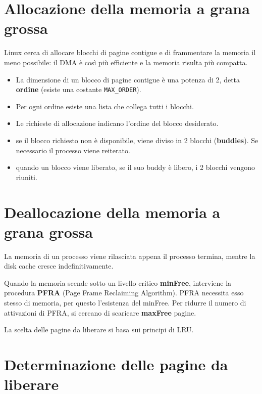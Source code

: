 \documentclass[12pt, a4paper]{report}
\begin{document}
\section{Allocazione della memoria a grana grossa}
Linux cerca di allocare blocchi di pagine contigue e di frammentare la memoria il
meno possibile: il DMA è così più efficiente e la memoria risulta più compatta.

\begin{itemize}
	\item La dimensione di un blocco di pagine contigue è una potenza di 2,
		detta \textbf{ordine} (esiste una costante \texttt{MAX\_ORDER}).
	\item Per ogni ordine esiste una lista che collega tutti i blocchi.
	\item Le richieste di allocazione indicano l'ordine del blocco desiderato.
	\item se il blocco richiesto non è disponibile, viene diviso in 2 blocchi
		(\textbf{buddies}). Se necessario il processo viene reiterato.
	\item quando un blocco viene liberato, se il suo buddy è libero, i 2
		blocchi vengono riuniti.
\end{itemize}

\section{Deallocazione della memoria a grana grossa}
La memoria di un processo viene rilasciata appena il processo termina, mentre la
disk cache cresce indefinitivamente.

Quando la memoria scende sotto un livello critico \textbf{minFree}, interviene
la procedura \textbf{PFRA} (Page Frame Reclaiming Algorithm). PFRA necessita
esso stesso di memoria, per questo l'esistenza del minFree. Per ridurre il
numero di attivazioni di PFRA, si cercano di scaricare \textbf{maxFree} pagine.

La scelta delle pagine da liberare si basa sui principi di LRU.

\section{Determinazione delle pagine da liberare}
\end{document}
